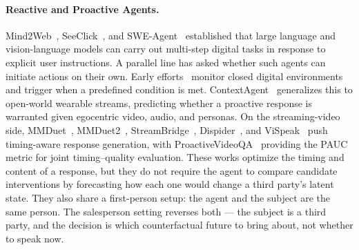 \documentclass{article}
\begin{document}
\paragraph{Reactive and Proactive Agents.}
Mind2Web~\cite{Mind2Web}, SeeClick~\cite{SeeClick}, and SWE-Agent~\cite{SWEAgent} established that large language and vision-language models can carry out multi-step digital tasks in response to explicit user instructions. A parallel line has asked whether such agents can initiate actions on their own. Early efforts~\cite{ProactiveAgent,CodingGenie,AskBeforePlan,ProAgent} monitor closed digital environments and trigger when a predefined condition is met. ContextAgent~\cite{ContextAgent} generalizes this to open-world wearable streams, predicting whether a proactive response is warranted given egocentric video, audio, and personas. On the streaming-video side, MMDuet~\cite{MMDuet}, MMDuet2~\cite{MMDuet2}, StreamBridge~\cite{StreamBridge}, Dispider~\cite{Dispider}, and ViSpeak~\cite{ViSpeak} push timing-aware response generation, with ProactiveVideoQA~\cite{ProactiveVideoQA} providing the PAUC metric for joint timing--quality evaluation. These works optimize the timing and content of a response, but they do not require the agent to compare candidate interventions by forecasting how each one would change a third party's latent state. They also share a first-person setup: the agent and the subject are the same person. The salesperson setting reverses both --- the subject is a third party, and the decision is which counterfactual future to bring about, not whether to speak now.
\end{document}
